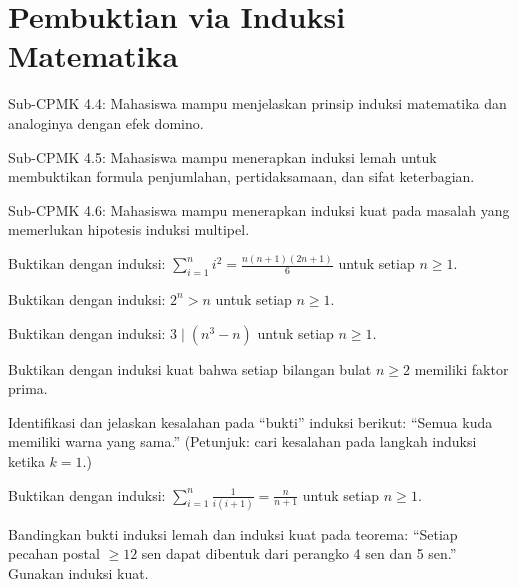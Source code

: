 \documentclass[../main]{subfiles}
\begin{document}
\chapter{Pembuktian via Induksi Matematika}

\begin{subcpmk}
  \item Sub-CPMK 4.4: Mahasiswa mampu menjelaskan prinsip induksi matematika dan analoginya dengan efek domino.
  \item Sub-CPMK 4.5: Mahasiswa mampu menerapkan induksi lemah untuk membuktikan formula penjumlahan, pertidaksamaan, dan sifat keterbagian.
  \item Sub-CPMK 4.6: Mahasiswa mampu menerapkan induksi kuat pada masalah yang memerlukan hipotesis induksi multipel.
\end{subcpmk}










\begin{aktivitas}
  \item Buktikan dengan induksi: $\displaystyle\sum_{i=1}^{n} i^2 = \frac{n(n+1)(2n+1)}{6}$ untuk setiap $n \geq 1$.
  \item Buktikan dengan induksi: $2^n > n$ untuk setiap $n \geq 1$.
  \item Buktikan dengan induksi: $3 \mid (n^3 - n)$ untuk setiap $n \geq 1$.
  \item Buktikan dengan induksi kuat bahwa setiap bilangan bulat $n \geq 2$ memiliki faktor prima.
  \item Identifikasi dan jelaskan kesalahan pada ``bukti'' induksi berikut: ``Semua kuda memiliki warna yang sama.'' (Petunjuk: cari kesalahan pada langkah induksi ketika $k = 1$.)
  \item Buktikan dengan induksi: $\displaystyle\sum_{i=1}^{n} \frac{1}{i(i+1)} = \frac{n}{n+1}$ untuk setiap $n \geq 1$.
  \item Bandingkan bukti induksi lemah dan induksi kuat pada teorema: ``Setiap pecahan postal $\geq 12$ sen dapat dibentuk dari perangko 4 sen dan 5 sen.'' Gunakan induksi kuat.
\end{aktivitas}
\end{document}
